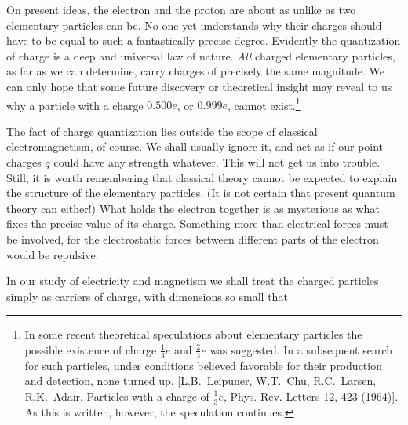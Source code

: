 On present ideas, the electron and the proton are about as
unlike as two elementary particles can be. No one yet understands why their
charges should have to be equal to such a fantastically precise degree.
Evidently the quantization of charge is a deep and universal law of nature.
\emph{All} charged elementary particles, as far as we can determine, carry
charges of precisely the same magnitude. We can only hope that some future
discovery or theoretical insight may reveal to us why a particle with a charge
$0.500e$, or $0.999e$, cannot exist.\footnote{In some recent theoretical speculations
about elementary particles the possible existence of charge $\frac{1}{3}e$ and $\frac{2}{3}e$
was suggested. In a subsequent search for such particles, under conditions believed
favorable for their production and detection, none turned up. [L.B.~Leipuner, W.T.~Chu,
R.C.~Larsen, R.K.~Adair, Particles with a charge of $\frac{1}{3}e$, Phys. Rev. Letters 12, 423 (1964)].
As this is written, however, the speculation continues.}

The fact of charge quantization lies outside the scope of
classical electromagnetism, of course. We shall usually ignore it, and act as
if our point charges $q$ could have any strength whatever. This will not get us
into trouble. Still, it is worth remembering that classical theory cannot be
expected to explain the structure of the elementary particles. (It is not
certain that present quantum theory can either!) What holds the electron
together is as mysterious as what fixes the precise value of its charge.
Something more than electrical forces must be involved, for the electrostatic
forces between different parts of the electron would be repulsive. 

In our study of electricity and magnetism we shall treat the
charged particles simply as carriers of charge, with dimensions so small
that

